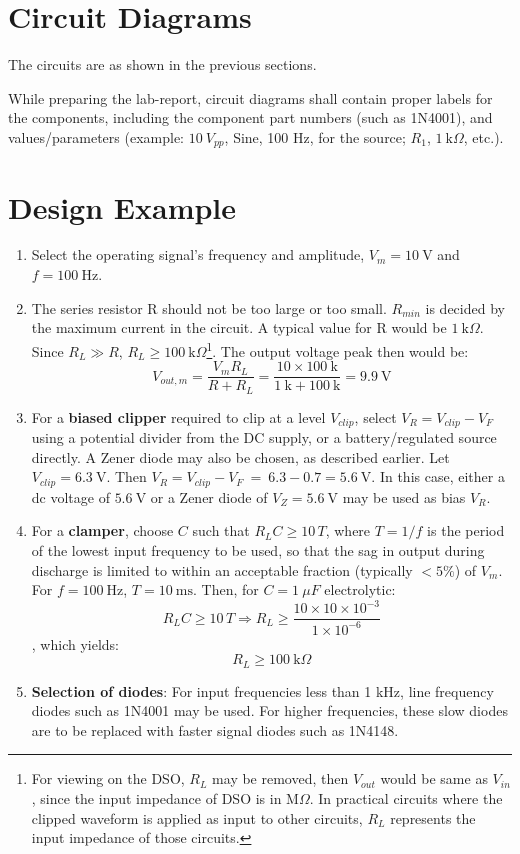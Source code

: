 \section{Circuit Diagrams}
The circuits are as shown in the previous sections.
\begin{notebox}
	While preparing the lab-report, circuit diagrams shall contain proper labels for the components, including the component part numbers (such as 1N4001), and values/parameters (example: $10\ V_{pp}$, Sine, 100 Hz, for the source; $R_1$, $1\ \text{k}\Omega$, etc.).
\end{notebox}	
\section{Design Example}
\begin{enumerate}[label=(\alph*)]
	\item Select the operating signal's frequency and amplitude, $V_m = 10\ \text{V}$ and $f = 100\ \text{Hz}$. 
	\item The series resistor R should not be too large or too small. $R_{min}$ is decided by the maximum current in the circuit. A typical value for R would be $1\ \text{k}\Omega$. Since $R_L\gg R$, $R_L \geq 100\ \text{k}\Omega$\footnote{For viewing on the DSO, $R_L$ may be removed, then $V_{out}$ would be same as $V_{in}$, since the input impedance of DSO is in $\text{M}\Omega$.  In practical circuits where the clipped waveform is applied as input to other circuits, $R_L$ represents the input impedance of those circuits.}. The output voltage peak then would be:
	\[
	V_{out,m}=\frac{V_mR_L}{R+R_L} = \frac{10\times 100\ \text{k}}{1\ \text{k}+100\ \text{k}} = 9.9 \ \text{V}
	\]
	
	\item For a \textbf{biased clipper} required to clip at a level $V_{clip}$, select $V_R = V_{clip} - V_F$ using a potential divider from the DC supply, or a battery/regulated source directly. A Zener diode may also be chosen, as described earlier. Let $V_{clip} = 6.3\ \text{V}$. Then $V_R = V_{clip} - V_F\ =\ 6.3-0.7 = 5.6\ \text{V}$. In this case, either a dc voltage of $5.6\ \text{V}$ or a Zener diode of $V_Z=5.6\ \text{V}$ may be used as bias $V_R$.
	\item For a \textbf{clamper}, choose $C$ such that $R_L C \geq 10\,T$, where $T = 1/f$ is the period of the lowest input frequency to be used, so that the sag in output during discharge is limited to within an acceptable fraction (typically $< 5\%$) of $V_m$. For $f=100\ \text{Hz}$, $T=10\ \text{ms}$. Then, for $C = 1\ \mu F$ electrolytic:
	\[
	R_L C \geq 10\,T \Rightarrow R_L \geq \frac{10\times 10\times 10^{-3}}{1\times 10^{-6}}
	\], which yields:
	\[
	R_L\geq 100\ \text{k}\Omega
	\]
	\item \textbf{Selection of diodes}: For input frequencies less than 1 kHz, line frequency diodes such as 1N4001 may be used. For higher frequencies, these slow diodes are to be replaced with faster signal diodes such as 1N4148.
\end{enumerate}
